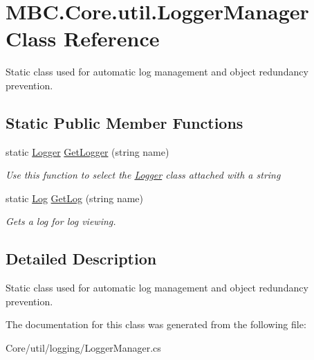 \hypertarget{class_m_b_c_1_1_core_1_1util_1_1_logger_manager}{\section{M\-B\-C.\-Core.\-util.\-Logger\-Manager Class Reference}
\label{class_m_b_c_1_1_core_1_1util_1_1_logger_manager}
}


Static class used for automatic log management and object redundancy prevention. 


\subsection*{Static Public Member Functions}
\begin{DoxyCompactItemize}
\item 
\hypertarget{class_m_b_c_1_1_core_1_1util_1_1_logger_manager_a8ec18cb07826e003bf2eb94ca672840f}{static \hyperlink{class_m_b_c_1_1_core_1_1util_1_1_logger}{Logger} \hyperlink{class_m_b_c_1_1_core_1_1util_1_1_logger_manager_a8ec18cb07826e003bf2eb94ca672840f}{Get\-Logger} (string name)}\label{class_m_b_c_1_1_core_1_1util_1_1_logger_manager_a8ec18cb07826e003bf2eb94ca672840f}

\begin{DoxyCompactList}\small\item\em Use this function to select the \hyperlink{class_m_b_c_1_1_core_1_1util_1_1_logger}{Logger} class attached with a string\end{DoxyCompactList}\item 
\hypertarget{class_m_b_c_1_1_core_1_1util_1_1_logger_manager_ac88762d28bd3ab323bf9ecb5e5d8b59f}{static \hyperlink{class_m_b_c_1_1_core_1_1util_1_1_log}{Log} \hyperlink{class_m_b_c_1_1_core_1_1util_1_1_logger_manager_ac88762d28bd3ab323bf9ecb5e5d8b59f}{Get\-Log} (string name)}\label{class_m_b_c_1_1_core_1_1util_1_1_logger_manager_ac88762d28bd3ab323bf9ecb5e5d8b59f}

\begin{DoxyCompactList}\small\item\em Gets a log for log viewing.\end{DoxyCompactList}\end{DoxyCompactItemize}


\subsection{Detailed Description}
Static class used for automatic log management and object redundancy prevention.

The documentation for this class was generated from the following file\-:\begin{DoxyCompactItemize}
\item 
Core/util/logging/Logger\-Manager.\-cs\end{DoxyCompactItemize}
